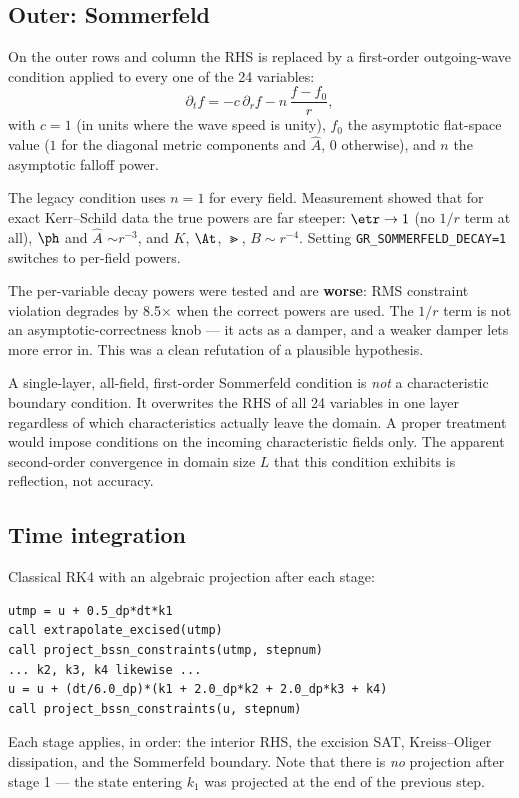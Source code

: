 \subsection{Outer: Sommerfeld}

On the outer rows and column the RHS is replaced by a first-order outgoing-wave
condition applied to every one of the 24 variables:
\begin{equation}
\label{eq:sommerfeld}
\partial_t f = -c\,\partial_r f - n\,\frac{f - f_0}{r},
\end{equation}
with $c = 1$ (in units where the wave speed is unity), $f_0$ the asymptotic
flat-space value ($1$ for the diagonal metric components and $\hat{A}$, $0$
otherwise), and $n$ the asymptotic falloff power.

The legacy condition uses $n = 1$ for every field. Measurement showed that for
exact Kerr--Schild data the true powers are far steeper:
$\etr \to 1$ (no $1/r$ term at all), $\ph$ and $\hat{A}$ $\sim r^{-3}$, and $K$,
$\At$, $\Gt$, $B \sim r^{-4}$. Setting \texttt{GR\_SOMMERFELD\_DECAY=1}
switches to per-field powers.

\gotcha
The per-variable decay powers were tested and are \textbf{worse}: RMS
constraint violation degrades by 8.5$\times$ when the correct powers are used.
The $1/r$ term is not an asymptotic-correctness knob --- it acts as a damper,
and a weaker damper lets more error in. This was a clean refutation of a
plausible hypothesis.

\gotcha
A single-layer, all-field, first-order Sommerfeld condition is \emph{not} a
characteristic boundary condition. It overwrites the RHS of all 24 variables
in one layer regardless of which characteristics actually leave the domain.
A proper treatment would impose conditions on the incoming characteristic
fields only. The apparent second-order convergence in domain size $L$ that this
condition exhibits is reflection, not accuracy.

\subsection{Time integration}

Classical RK4 with an algebraic projection after each stage:
\begin{lstlisting}
utmp = u + 0.5_dp*dt*k1
call extrapolate_excised(utmp)
call project_bssn_constraints(utmp, stepnum)
... k2, k3, k4 likewise ...
u = u + (dt/6.0_dp)*(k1 + 2.0_dp*k2 + 2.0_dp*k3 + k4)
call project_bssn_constraints(u, stepnum)
\end{lstlisting}
Each stage applies, in order: the interior RHS, the excision SAT, Kreiss--Oliger
dissipation, and the Sommerfeld boundary. Note that there is \emph{no}
projection after stage 1 --- the state entering $k_1$ was projected at the end
of the previous step.

